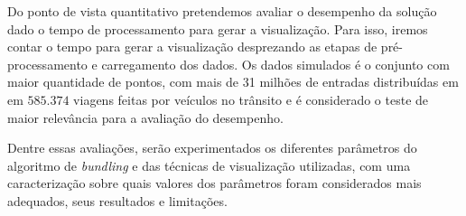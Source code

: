   Do ponto de vista quantitativo pretendemos avaliar o desempenho da solução
dado o tempo de processamento para gerar a visualização. Para isso, iremos
contar o tempo para gerar a visualização desprezando as etapas de
pré-processamento e carregamento dos dados. Os dados simulados é o conjunto com
maior quantidade de pontos, com mais de 31 milhões de entradas distribuídas em
em $585.374$ viagens feitas por veículos no trânsito e é considerado o teste de
maior relevância para a avaliação do desempenho.

 Dentre essas avaliações, serão experimentados os diferentes parâmetros do
algoritmo de \emph{bundling} e das técnicas de visualização utilizadas, com uma
caracterização sobre quais valores dos parâmetros foram considerados mais
adequados, seus resultados e limitações.
